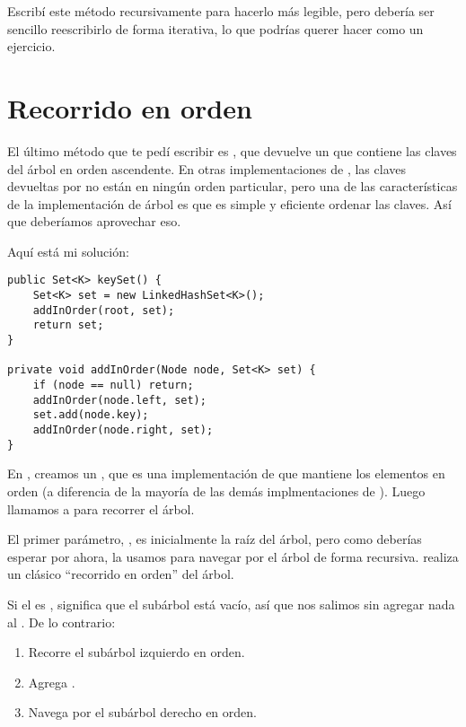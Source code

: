 \documentclass[12pt]{book}
\theoremstyle{exercise}
\begin{document}

Escribí este método recursivamente para hacerlo más legible, pero debería
ser sencillo reescribirlo de forma iterativa, lo que podrías querer
hacer como un ejercicio.


\section{Recorrido en orden}
\label{in-order-traversal}

El último método que te pedí escribir es , que devuelve
un  que contiene las claves del árbol en orden ascendente.
En otras implementaciones de , las claves devueltas por
 no están en ningún orden particular, pero una de las 
características de la implementación de árbol es que es simple y eficiente
ordenar las claves. Así que deberíamos aprovechar eso.


Aquí está mi solución:

\begin{verbatim}
public Set<K> keySet() {
    Set<K> set = new LinkedHashSet<K>();
    addInOrder(root, set);
    return set;
}

private void addInOrder(Node node, Set<K> set) {
    if (node == null) return;
    addInOrder(node.left, set);
    set.add(node.key);
    addInOrder(node.right, set);        
}
\end{verbatim}

En , creamos un , que es una
implementación de  que mantiene los elementos en orden (a diferencia
de la mayoría de las demás implmentaciones de ). Luego llamamos a
 para recorrer el árbol.


El primer parámetro, , es inicialmente la raíz del árbol,
pero como deberías esperar por ahora, la usamos para navegar por el árbol
de forma recursiva.  realiza un clásico ``recorrido
en orden'' del árbol.

Si el  es , significa que el subárbol está vacío, así que
nos salimos sin agregar nada al . De lo contrario:

\begin{enumerate}

\item
  Recorre el subárbol izquierdo en orden.

\item
  Agrega .

\item
  Navega por el subárbol derecho en orden.

\end{enumerate}
\end{document}
